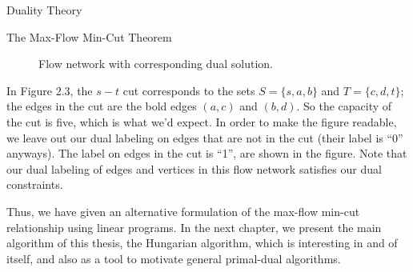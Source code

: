 \begin{section}{Duality Theory}
\begin{subsection}{The Max-Flow Min-Cut Theorem}
\begin{figure}[H]
		\caption{Flow network with corresponding dual solution.}
	\end{figure}
	In Figure 2.3, the $s-t$ cut corresponds to the sets $S= \{s,a,b\}$ and $T = \{c,d,t\}$; the 
	edges in the cut are the bold edges $(a,c)$ and $(b,d)$. So the capacity of the cut is five, 
	which is what we'd expect. In order to make the figure readable, we leave out our dual labeling 
	on edges that are not in the cut (their label is ``0'' anyways). The label on edges in the cut is 
	``1'', are shown in the figure. Note that our dual labeling of edges and vertices in this flow 
	network satisfies our dual constraints.

	Thus, we have given an alternative formulation of the max-flow min-cut relationship using 
	linear programs. In the next chapter, we present the main algorithm of this thesis, the 
	Hungarian algorithm, which is interesting in and of itself, and also as a tool to motivate 
	general primal-dual algorithms.
\end{subsection}
\end{section}
